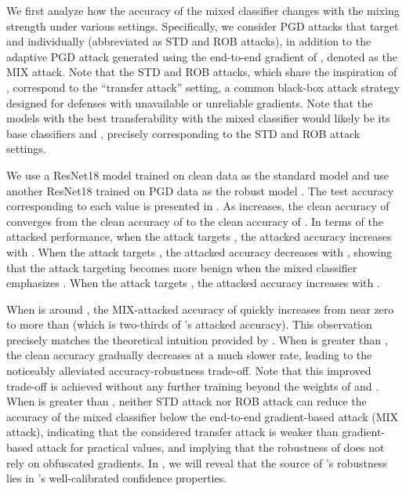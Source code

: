 \documentclass[11pt, letterpaper]{article}
\theoremstyle{plain}
\theoremstyle{definition}
\begin{document}
We first analyze how the accuracy of the mixed classifier changes with the mixing strength  under various settings. Specifically, we consider PGD attacks that target  and  individually (abbreviated as STD and ROB attacks), in addition to the adaptive PGD attack generated using the end-to-end gradient of , denoted as the MIX attack. Note that the STD and ROB attacks, which share the inspiration of \citep{Gao22}, correspond to the ``transfer attack'' setting, a common black-box attack strategy designed for defenses with unavailable or unreliable gradients. Note that the models with the best transferability with the mixed classifier  would likely be its base classifiers  and , precisely corresponding to the STD and ROB attack settings.

We use a ResNet18 model trained on clean data as the standard model  and use another ResNet18 trained on PGD data as the robust model . The test accuracy corresponding to each  value is presented in . As  increases, the clean accuracy of  converges from the clean accuracy of  to the clean accuracy of . In terms of the attacked performance, when the attack targets , the attacked accuracy increases with . When the attack targets , the attacked accuracy decreases with , showing that the attack targeting  becomes more benign when the mixed classifier emphasizes . When the attack targets , the attacked accuracy increases with .

When  is around , the MIX-attacked accuracy of  quickly increases from near zero to more than  (which is two-thirds of 's attacked accuracy). This observation precisely matches the theoretical intuition provided by . When  is greater than , the clean accuracy gradually decreases at a much slower rate, leading to the noticeably alleviated accuracy-robustness trade-off. Note that this improved trade-off is achieved without any further training beyond the weights of  and . When  is greater than , neither STD attack nor ROB attack can reduce the accuracy of the mixed classifier below the end-to-end gradient-based attack (MIX attack), indicating that the considered transfer attack is weaker than gradient-based attack for practical  values, and implying that the robustness of  does not rely on obfuscated gradients. In , we will reveal that the source of 's robustness lies in 's well-calibrated confidence properties.
\end{document}

